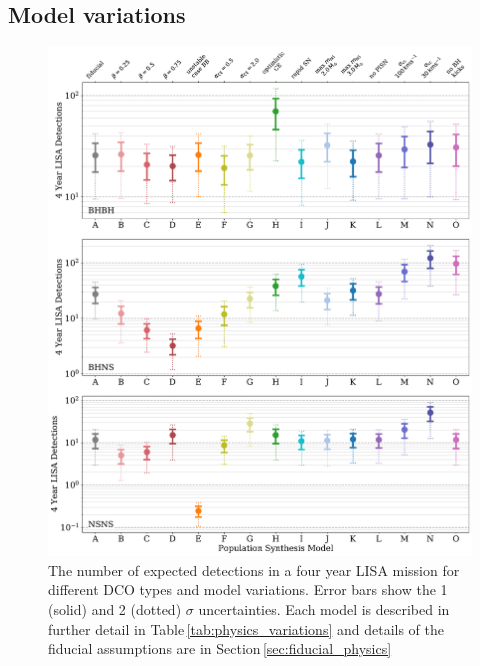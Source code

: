 \documentclass[twocolumn]{aastex63}
\begin{document}
\subsection{Model variations}

\begin{figure}[p]
    \centering
    \includegraphics[width=\textwidth]{dco_detections_variations.pdf}
    \caption{The number of expected detections in a four year LISA mission for different DCO types and model variations. Error bars show the 1 (solid) and 2 (dotted) $\sigma$ uncertainties. Each model is described in further detail in Table\,\ref{tab:physics_variations} and details of the fiducial assumptions are in  Section\,\ref{sec:fiducial_physics}}
    \label{fig:model_variation_detections}
\end{figure}
\end{document}
